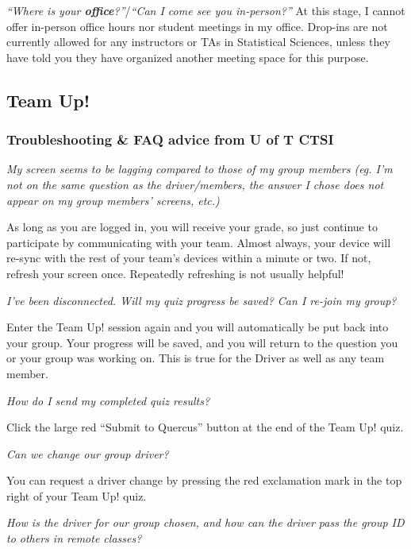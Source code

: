 \documentclass[
]{book}
\begin{document}
\emph{``Where is your \textbf{office}?''}/\emph{``Can I come see you in-person?''} At this stage, I cannot offer in-person office hours nor student meetings in my office. Drop-ins are not currently allowed for any instructors or TAs in Statistical Sciences, unless they have told you they have organized another meeting space for this purpose.

\hypertarget{team-up}{%
\subsection{Team Up!}\label{team-up}}

\hypertarget{troubleshooting-faq-advice-from-u-of-t-ctsi}{%
\subsubsection{Troubleshooting \& FAQ advice from U of T CTSI}\label{troubleshooting-faq-advice-from-u-of-t-ctsi}}

\emph{My screen seems to be lagging compared to those of my group members (eg. I'm not on the same question as the driver/members, the answer I chose does not appear on my group members' screens, etc.)}

As long as you are logged in, you will receive your grade, so just continue to participate by communicating with your team. Almost always, your device will re-sync with the rest of your team's devices within a minute or two. If not, refresh your screen once. Repeatedly refreshing is not usually helpful!

\emph{I've been disconnected. Will my quiz progress be saved? Can I re-join my group?}

Enter the Team Up! session again and you will automatically be put back into your group. Your progress will be saved, and you will return to the question you or your group was working on. This is true for the Driver as well as any team member.

\emph{How do I send my completed quiz results?}

Click the large red ``Submit to Quercus'' button at the end of the Team Up! quiz.

\emph{Can we change our group driver?}

You can request a driver change by pressing the red exclamation mark in the top right of your Team Up! quiz.

\emph{How is the driver for our group chosen, and how can the driver pass the group ID to others in remote classes?}
\end{document}

